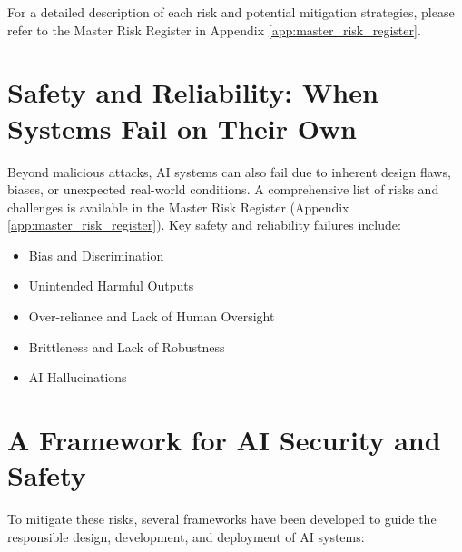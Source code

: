 For a detailed description of each risk and potential mitigation strategies, please refer to the Master Risk Register in Appendix \ref{app:master_risk_register}.

\section{Safety and Reliability: When Systems Fail on Their Own}
\label{sec:safety_and_reliability}

Beyond malicious attacks, AI systems can also fail due to inherent design flaws, biases, or unexpected real-world conditions. A comprehensive list of risks and challenges is available in the Master Risk Register (Appendix \ref{app:master_risk_register}). Key safety and reliability failures include:

\begin{itemize}
    \item Bias and Discrimination
    \item Unintended Harmful Outputs
    \item Over-reliance and Lack of Human Oversight
    \item Brittleness and Lack of Robustness
    \item AI Hallucinations
\end{itemize}

\section{A Framework for AI Security and Safety}
\label{sec:security_framework}
To mitigate these risks, several frameworks have been developed to guide the responsible design, development, and deployment of AI systems:

